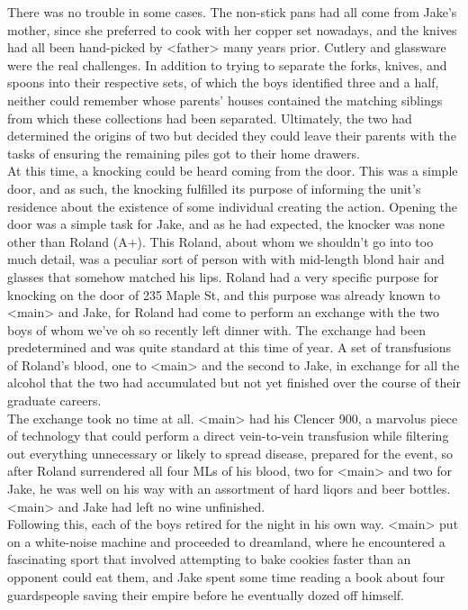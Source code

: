 \documentclass[12pt,openany]{memoir}
\begin{document}
There was no trouble in some cases.  The non-stick pans had all come from Jake's mother, since she preferred to cook with her copper set nowadays, and the knives had all been hand-picked by <father> many years prior.
Cutlery and glassware were the real challenges.
In addition to trying to separate the forks, knives, and spoons into their respective sets, of which the boys identified three and a half, neither could remember whose parents' houses contained the matching siblings from which these collections had been separated.
Ultimately, the two had determined the origins of two but decided they could leave their parents with the tasks of ensuring the remaining piles got to their home drawers.
\\

At this time, a knocking could be heard coming from the door.
This was a simple door, and as such, the knocking fulfilled its purpose of informing the unit's residence about the existence of some individual creating the action.
Opening the door was a simple task for Jake, and as he had expected, the knocker was none other than Roland (A+).
This Roland, about whom we shouldn't go into too much detail, was a peculiar sort of person with with mid-length blond hair and glasses that somehow matched his lips.
Roland had a very specific purpose for knocking on the door of 235 Maple St, and this purpose was already known to <main> and Jake, for Roland had come to perform an exchange with the two boys of whom we've oh so recently left dinner with.
The exchange had been predetermined and was quite standard at this time of year.
A set of transfusions of Roland's blood, one to <main> and the second to Jake, in exchange for all the alcohol that the two had accumulated but not yet finished over the course of their graduate careers.
\\

The exchange took no time at all.
<main> had his Clencer 900, a marvolus piece of technology that could perform a direct vein-to-vein transfusion while filtering out everything unnecessary or likely to spread disease, prepared for the event, so after Roland surrendered all four MLs of his blood, two for <main> and two for Jake, he was well on his way with an assortment of hard liqors and beer bottles.
<main> and Jake had left no wine unfinished.
\\

Following this, each of the boys retired for the night in his own way.
<main> put on a white-noise machine and proceeded to dreamland, where he encountered a fascinating sport that involved attempting to bake cookies faster than an opponent could eat them, and Jake spent some time reading a book about four guardspeople saving their empire before he eventually dozed off himself.
\\
\end{document}
